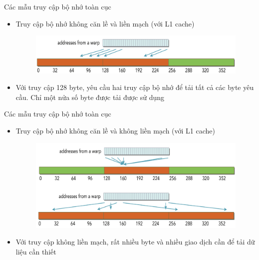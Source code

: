 \documentclass[10pt]{beamer}
\theoremstyle{remark}
\numberwithin{algocf}{section}
\numberwithin{equation}{section}
\numberwithin{dl}{section}
\numberwithin{figure}{section}
\begin{document}
\begin{frame}{Các mẫu truy cập bộ nhớ toàn cục}
    \begin{itemize}
        \item Truy cập bộ nhớ không căn lề và liền mạch (với L1 cache)
        \begin{figure}[H]
                \centering
                \includegraphics[width=0.7\linewidth]{figures/CUDA/Misaligned_Coalesced_Global_Memory_Transaction.png}
        \end{figure}
        \item Với truy cập 128 byte, yêu cầu hai truy cập bộ nhớ để tải tất cả các byte yêu cầu.
        Chỉ một nửa số byte được tải được sử dụng
    \end{itemize}
\end{frame}

\begin{frame}{Các mẫu truy cập bộ nhớ toàn cục}
    \begin{itemize}
        \item Truy cập bộ nhớ không căn lề và không liền mạch (với L1 cache)
        \begin{figure}[H]
            \centering
            \includegraphics[width=0.7\linewidth]{figures/CUDA/Misaligned_Uncoalesced_Global_Memory_Transaction.png}
        \end{figure}
        \item Với truy cập không liền mạch, rất nhiều byte và nhiều giao dịch cần để tải dữ liệu cần thiết
    \end{itemize}
\end{frame}
\end{document}
